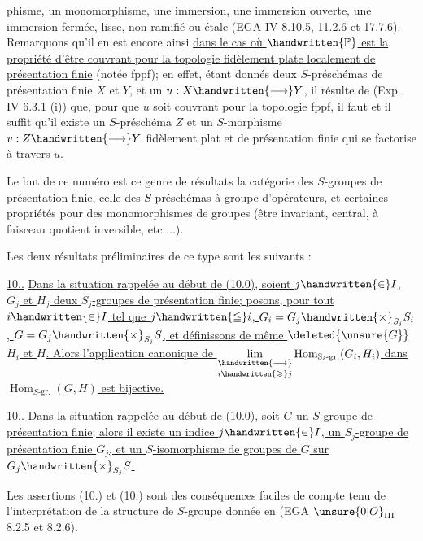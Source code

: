 %
%
phisme, un monomorphisme, une immersion, une immersion ouverte, une immersion fermée, lisse, non ramifié ou étale (EGA IV 8.10.5, 11.2.6 et 17.7.6). Remarquons qu'il en est encore ainsi  \uline{dans le cas où $\handwritten{\mathbb{P}}$ est la propriété d'être couvrant pour la topologie fidèlement plate localement de présentation finie} (notée fppf); en effet, étant donnés deux $S$-préschémas de présentation finie $X$ et $Y$, et un  $u:X\handwritten{\longrightarrow}Y$, il résulte de (Exp. IV 6.3.1 (i))\deleted{,} que, pour que $u$ soit couvrant pour la topologie fppf, il faut et il suffit qu'il existe un $S$-préschéma $Z$ et un $S$-morphisme $v:Z\handwritten{\longrightarrow}Y$ fidèlement plat et de présentation finie qui se factorise à travers $u$.

Le but de ce numéro est  ce genre de résultats  la catégorie des $S$-groupes de présentation finie,  celle des $S$-préschémas à groupe d'opérateurs, et  certaines propriétés pour des monomorphismes de groupes (être invariant, central, à faisceau quotient inversible, etc ...).

Les deux résultats préliminaires de ce type sont les suivants :

\uline{10..}  \uline{Dans la situation rappelée au début de (10.0), soient  $j\handwritten{\in}I$, $G_j$ et $H_j$ deux $S_j$-groupes de présentation finie; posons, pour tout $i\handwritten{\in}I$ tel que $j\handwritten{\leqq}i$, $G_i=G_j\handwritten{\times}_{S_j}S_i$, $G=G_j\handwritten{\times}_{S_j}S$, et définissons de même $\deleted{\unsure{G}}$ $H_i$ et $H$. Alors l'application canonique de $\underset{i\handwritten{\geqslant}j}{\underset{\handwritten{\longrightarrow}}{\lim}}\operatorname{Hom}_{\mathbb{S}_i\text{-gr.}}(G_i,H_i)$ dans $\operatorname{Hom}_{S\text{-gr.}}(G,H)$ est bijective.}

\uline{10..}  \uline{Dans la situation rappelée au début de (10.0), soit $G$ un $S$-groupe de présentation finie; alors il existe un indice $j\handwritten{\in}I$,  un $S_j$-groupe de présentation  finie $G_j$, et un  $S$-isomorphisme de groupes de $G$ sur $G_j\handwritten{\times}_{S_j}S$.}

Les assertions (10.) et (10.) sont des conséquences faciles de  compte tenu de l'interprétation de la structure de $S$-groupe donnée en (EGA $\unsure{0|O}_{\mathrm{III}}$ 8.2.5 et 8.2.6).
